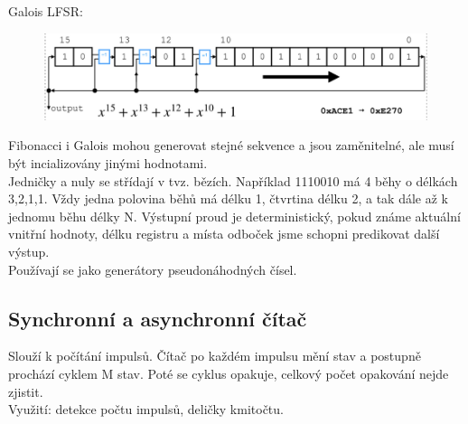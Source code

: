 Galois LFSR: \\
\begin{figure}[h!]
    \centering
    \includegraphics*[scale = 0.4]{img/Galois.png}
\end{figure}

Fibonacci i Galois mohou generovat stejné sekvence a jsou zaměnitelné, ale musí být incializovány jinými hodnotami.\\
Jedničky a nuly se střídají v tvz. bězích. Například 1110010 má 4 běhy o délkách 3,2,1,1. Vždy jedna polovina běhů má délku 1, čtvrtina délku 2, a tak dále až k jednomu běhu délky N.
Výstupní proud je deterministický, pokud známe aktuální vnitřní hodnoty, délku registru a místa odboček jsme schopni predikovat další výstup.\\
Používají se jako generátory pseudonáhodných čísel.

\subsection{Synchronní a asynchronní čítač}
Slouží k počítání impulsů. Čítač po každém impulsu mění stav a postupně prochází cyklem M stav. Poté se cyklus opakuje, celkový počet opakování nejde zjistit.\\
Využití: detekce počtu impulsů, deličky kmitočtu.\\

